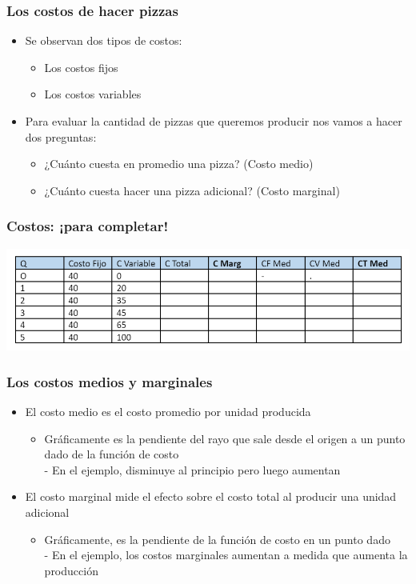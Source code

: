 \documentclass{beamer}
\begin{document}
\begin{frame}
\frametitle{Los costos de hacer pizzas}
\begin{itemize}
    \item Se observan dos tipos de costos: 
        \begin{itemize}
        \item Los costos fijos
        \item Los costos variables
        \end{itemize}
    \vspace{2mm}
    \item Para evaluar la cantidad de pizzas que queremos producir nos vamos a hacer dos preguntas:
        \begin{itemize}
        \item ¿Cuánto cuesta en promedio una pizza? (Costo medio)
        \item ¿Cuánto cuesta hacer una pizza adicional? (Costo marginal)
        \end{itemize}
\end{itemize}
\end{frame}

\begin{frame}
\frametitle{Costos: ¡para completar! }
\centering
\includegraphics[scale=0.6]{../Figures/Cost1.png}
\end{frame}

\begin{frame}
\frametitle{Los costos medios y marginales}
\begin{itemize}
    \item El costo medio es el costo promedio por unidad producida
    \begin{itemize}
        \item Gráficamente es la pendiente del rayo que sale desde el origen a un punto dado de la función de costo \\
        - En el ejemplo, disminuye al principio pero luego aumentan 
    \end{itemize}
    \item El costo marginal mide el efecto sobre el costo total al producir una unidad adicional
    \begin{itemize}
        \item Gráficamente, es la pendiente de la función de costo en un punto dado \\
        - En el ejemplo, los costos marginales aumentan a medida que aumenta la producción
    \end{itemize}
\end{itemize}
\end{frame}
\end{document}

